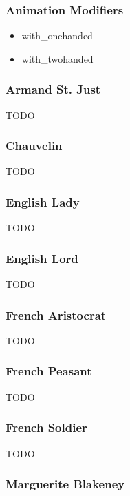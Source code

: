 \subsubsection{Animation Modifiers}

\begin{itemize}

\item with\_onehanded
\item with\_twohanded

\end{itemize}

\subsubsection{Armand St. Just}

TODO

\subsubsection{Chauvelin}

TODO

\subsubsection{English Lady}

TODO

\subsubsection{English Lord}

TODO

\subsubsection{French Aristocrat}

TODO

\subsubsection{French Peasant}

TODO

\subsubsection{French Soldier}

TODO

\subsubsection{Marguerite Blakeney}

